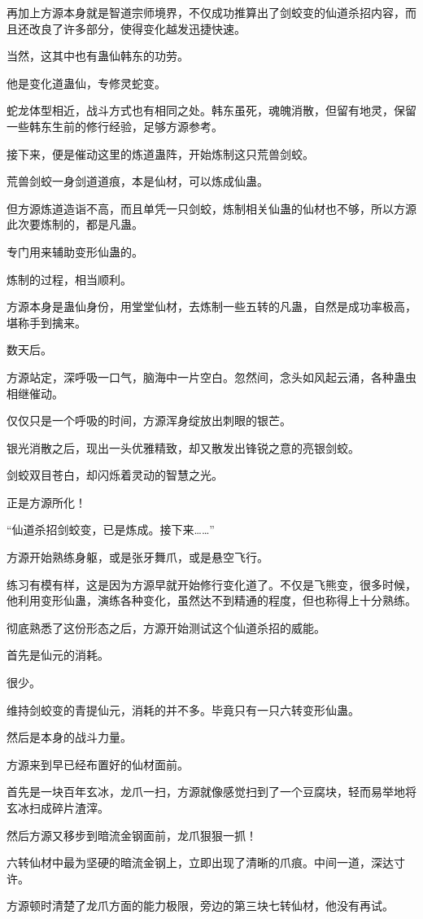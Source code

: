 \begin{this_body}
再加上方源本身就是智道宗师境界，不仅成功推算出了剑蛟变的仙道杀招内容，而且还改良了许多部分，使得变化越发迅捷快速。

当然，这其中也有蛊仙韩东的功劳。

他是变化道蛊仙，专修灵蛇变。

蛇龙体型相近，战斗方式也有相同之处。韩东虽死，魂魄消散，但留有地灵，保留一些韩东生前的修行经验，足够方源参考。

接下来，便是催动这里的炼道蛊阵，开始炼制这只荒兽剑蛟。

荒兽剑蛟一身剑道道痕，本是仙材，可以炼成仙蛊。

但方源炼道造诣不高，而且单凭一只剑蛟，炼制相关仙蛊的仙材也不够，所以方源此次要炼制的，都是凡蛊。

专门用来辅助变形仙蛊的。

炼制的过程，相当顺利。

方源本身是蛊仙身份，用堂堂仙材，去炼制一些五转的凡蛊，自然是成功率极高，堪称手到擒来。

数天后。

方源站定，深呼吸一口气，脑海中一片空白。忽然间，念头如风起云涌，各种蛊虫相继催动。

仅仅只是一个呼吸的时间，方源浑身绽放出刺眼的银芒。

银光消散之后，现出一头优雅精致，却又散发出锋锐之意的亮银剑蛟。

剑蛟双目苍白，却闪烁着灵动的智慧之光。

正是方源所化！

“仙道杀招剑蛟变，已是炼成。接下来……”

方源开始熟练身躯，或是张牙舞爪，或是悬空飞行。

练习有模有样，这是因为方源早就开始修行变化道了。不仅是飞熊变，很多时候，他利用变形仙蛊，演练各种变化，虽然达不到精通的程度，但也称得上十分熟练。

彻底熟悉了这份形态之后，方源开始测试这个仙道杀招的威能。

首先是仙元的消耗。

很少。

维持剑蛟变的青提仙元，消耗的并不多。毕竟只有一只六转变形仙蛊。

然后是本身的战斗力量。

方源来到早已经布置好的仙材面前。

首先是一块百年玄冰，龙爪一扫，方源就像感觉扫到了一个豆腐块，轻而易举地将玄冰扫成碎片渣滓。

然后方源又移步到暗流金钢面前，龙爪狠狠一抓！

六转仙材中最为坚硬的暗流金钢上，立即出现了清晰的爪痕。中间一道，深达寸许。

方源顿时清楚了龙爪方面的能力极限，旁边的第三块七转仙材，他没有再试。

\end{this_body}


